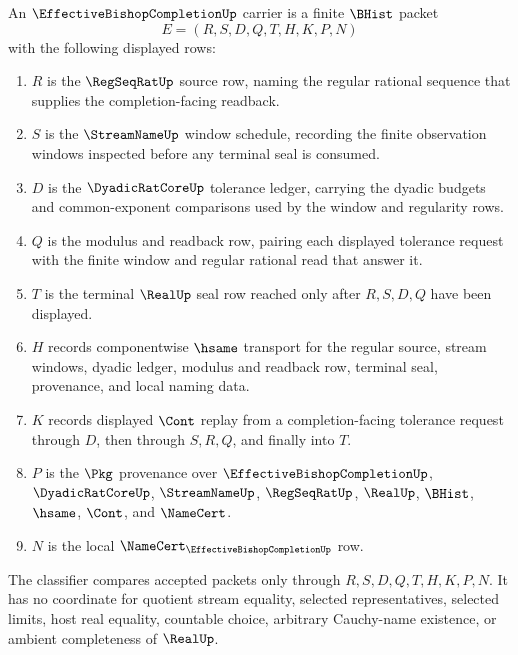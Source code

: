 \begin{definition}
\label{def:effective-bishop-completion-carrier}
An $\EffectiveBishopCompletionUp$ carrier is a finite $\BHist$ packet
$$
E=(R,S,D,Q,T,H,K,P,N)
$$
with the following displayed rows:
\begin{enumerate}
\item $R$ is the $\RegSeqRatUp$ source row, naming the regular rational sequence that supplies the completion-facing readback.
\item $S$ is the $\StreamNameUp$ window schedule, recording the finite observation windows inspected before any terminal seal is consumed.
\item $D$ is the $\DyadicRatCoreUp$ tolerance ledger, carrying the dyadic budgets and common-exponent comparisons used by the window and regularity rows.
\item $Q$ is the modulus and readback row, pairing each displayed tolerance request with the finite window and regular rational read that answer it.
\item $T$ is the terminal $\RealUp$ seal row reached only after $R,S,D,Q$ have been displayed.
\item $H$ records componentwise $\hsame$ transport for the regular source, stream windows, dyadic ledger, modulus and readback row, terminal seal, provenance, and local naming data.
\item $K$ records displayed $\Cont$ replay from a completion-facing tolerance request through $D$, then through $S,R,Q$, and finally into $T$.
\item $P$ is the $\Pkg$ provenance over $\EffectiveBishopCompletionUp$, $\DyadicRatCoreUp$, $\StreamNameUp$, $\RegSeqRatUp$, $\RealUp$, $\BHist$, $\hsame$, $\Cont$, and $\NameCert$.
\item $N$ is the local $\NameCert_{\EffectiveBishopCompletionUp}$ row.
\end{enumerate}
The classifier compares accepted packets only through $R,S,D,Q,T,H,K,P,N$. It has no coordinate for quotient stream equality, selected representatives, selected limits, host real equality, countable choice, arbitrary Cauchy-name existence, or ambient completeness of $\RealUp$.
\end{definition}

